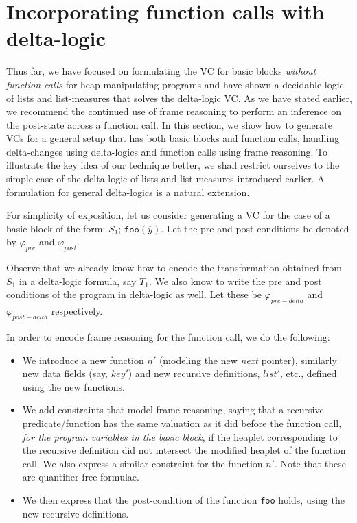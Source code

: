 \section{Incorporating function calls with delta-logic}
\label{sec:generalvc}
Thus far, we have focused on formulating the VC for basic blocks \emph{without function calls} for heap manipulating programs and have shown a decidable logic of lists and list-measures that solves the delta-logic VC. As we have stated earlier, we recommend the continued use of frame reasoning to perform an inference on the post-state across a function call. In this section, we show how to generate VCs for a general setup that has both basic blocks and function calls, handling delta-changes using delta-logics and function calls using frame reasoning. To illustrate the key idea of our technique better, we shall restrict ourselves to the simple case of the delta-logic of lists and list-measures introduced earlier. A formulation for general delta-logics is a natural extension.

For simplicity of exposition, let us consider generating a VC for the case of a basic block of the form: $S_1;\, \texttt{foo}(\overline{y})$. Let the pre and post conditions be denoted by $\varphi_{pre}$ and $\varphi_{post}$.

Observe that we already know how to encode the transformation obtained from $S_1$ in a delta-logic formula, say $T_1$. We also know to write the pre and post conditions of the program in delta-logic as well. Let these be $\varphi_{pre-delta}$ and $\varphi_{post-delta}$ respectively.

In order to encode frame reasoning for the function call, we do the following:
\begin{itemize}
 \item We introduce a new function $n'$ (modeling the new \textit{next} pointer), similarly new data fields (say, $key'$) and new recursive definitions, $\textit{list}'$, etc., defined using the new functions.
 \item We add constraints that model frame reasoning, saying that a recursive predicate/function has the same valuation as it did before the function call, \emph{for the program variables in the basic block}, if the heaplet corresponding to the recursive definition did not intersect the modified heaplet of the function call. We also express a similar constraint for the function $n'$. Note that these are quantifier-free formulae.
 \item We then express that the post-condition of the function \texttt{foo} holds, using the new recursive definitions.
\end{itemize}

